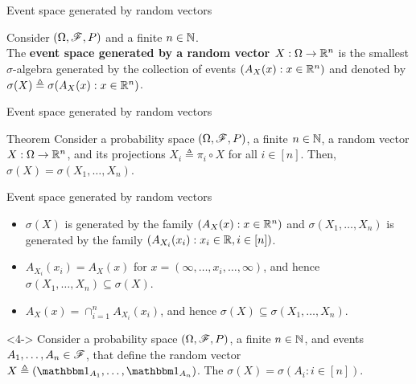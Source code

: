 \documentclass[12pt,aspectratio=169]{beamer}
\begin{document}
\begin{frame}{Event space generated by random vectors}
\begin{Definition} %
Consider $(\Omega, \mathscr{F}, P)$ and a finite $n \in \mathbb{N}$.\\
The \textbf{event space generated by a random vector $X:\Omega \to \mathbb{R}^n$} is the smallest $\sigma$-algebra generated by the collection of events $(A_X(x): x \in \mathbb{R}^n)$ and denoted by $\sigma(X) \triangleq \sigma(A_X(x):x \in \mathbb{R}^n)$.  
\end{Definition}
\end{frame}
\begin{frame}{Event space generated by random vectors}
\begin{block}{Theorem}
Consider a probability space $(\Omega, \mathscr{F}, P)$, a finite $n \in \mathbb{N}$, 
a random vector $X: \Omega \to \mathbb{R}^n$, and its projections $X_i \triangleq \pi_i \circ X$ for all $i \in [n]$. 
Then, $\sigma(X) = \sigma(X_1, \dots, X_n)$.   
\end{block}
\end{frame}
\begin{frame}{Event space generated by random vectors}
\begin{Proof}
\begin{itemize}
\item <1-> $\sigma(X)$ is generated by the family $(A_X(x): x \in \mathbb{R}^n)$ and $\sigma(X_1, \dots, X_n)$ is generated by the family $(A_{X_i}(x_i): x_i \in \mathbb{R}, i \in [n])$. 
\item <2-> $A_{X_i}(x_i) = A_X(x)$ for $x = (\infty, \dots, x_i, \dots, \infty)$, and hence $\sigma(X_1, \dots, X_n) \subseteq \sigma(X)$.
\item <3-> $A_X(x) = \cap_{i=1}^nA_{X_i}(x_i)$, and hence $\sigma(X) \subseteq \sigma(X_1, \dots, X_n)$. 
\end{itemize}
\end{Proof}

\begin{Example}<4->
Consider a probability space $(\Omega, \mathscr{F}, P)$, a finite $n \in \mathbb{N}$, and events $A_1, \dots, A_n \in \mathscr{F}$, 
that define the random vector $X \triangleq (\Ind{A_1}, \dots, \Ind{A_n})$. 
The $\sigma(X) = \sigma(A_i: i \in [n])$. 
\end{Example}
\end{frame}
\end{document}
